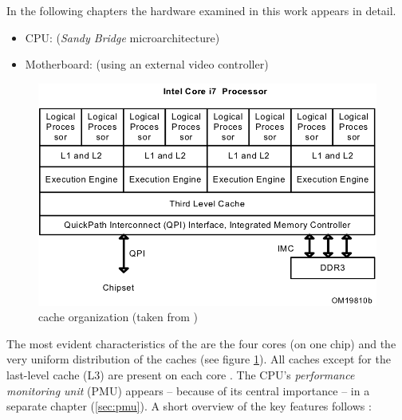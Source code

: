 \label{sec:technical-prerequisites}

In the following chapters the hardware examined in this work appears in detail.


\label{sec:hw-products}

\begin{itemize}

\item CPU: \JWPLcpu{} (\emph{Sandy Bridge}\cite{wiki:snb} microarchitecture)

\item Motherboard: \JWPLboard{} (using an external video controller)

\end{itemize}


\label{sec:sandy-bridge}

\begin{figure}
  \centering
    \includegraphics[width=\textwidth]{fig/intel-cache-orga.png}
  \caption{\JWPcpu{} cache organization (taken from \cite{intel2011softdev1})}
  \label{fig:cache-orga}
\end{figure}

The most evident characteristics of the \JWPcpu{} are the four cores (on one
chip) and the very uniform distribution of the caches (see figure
\ref{fig:cache-orga}). All caches except for the last-level cache (L3) are
present on each core \cite{fog11}. The CPU's \emph{performance monitoring unit}
(PMU) appears -- because of its central importance -- in a separate chapter
(\ref{sec:pmu}). A short overview of the key features follows
\cite{intel2011spec}:

